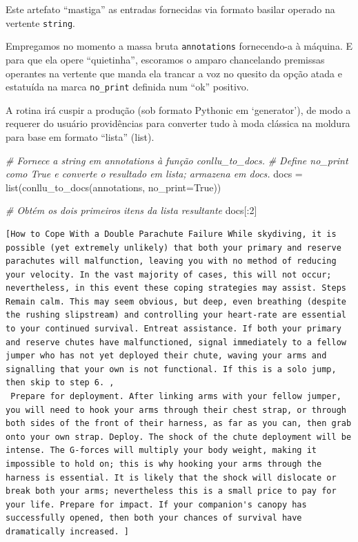 \documentclass[
  brazilian,
]{article}
\newenvironment{Shaded}{}{}
\newcommand{\BuiltInTok}[1]{#1}
\newcommand{\CommentTok}[1]{\textcolor[rgb]{0.38,0.63,0.69}{\textit{#1}}}
\newcommand{\DecValTok}[1]{\textcolor[rgb]{0.25,0.63,0.44}{#1}}
\newcommand{\NormalTok}[1]{#1}
\newcommand{\OperatorTok}[1]{\textcolor[rgb]{0.40,0.40,0.40}{#1}}
\newcommand{\VariableTok}[1]{\textcolor[rgb]{0.10,0.09,0.49}{#1}}
\begin{document}
Este artefato ``mastiga'' as entradas fornecidas via formato basilar
operado na vertente \texttt{string}.

Empregamos no momento a massa bruta \texttt{annotations} fornecendo-a à
máquina. E para que ela opere ``quietinha'', escoramos o amparo
chancelando premissas operantes na vertente que manda ela trancar a voz
no quesito da opção atada e estatuída na marca \texttt{no\_print}
definida num ``ok'' positivo.

A rotina irá cuspir a produção (sob formato Pythonic em `generator'), de
modo a requerer do usuário providências para converter tudo à moda
clássica na moldura para base em formato ``lista'' (list).

\begin{Shaded}
\begin{Highlighting}[]
\CommentTok{\# Fornece a string em \textquotesingle{}annotations\textquotesingle{} à função \textquotesingle{}conllu\_to\_docs\textquotesingle{}.}
\CommentTok{\# Define \textquotesingle{}no\_print\textquotesingle{} como True e converte o resultado em lista; armazena em \textquotesingle{}docs\textquotesingle{}.}
\NormalTok{docs }\OperatorTok{=} \BuiltInTok{list}\NormalTok{(conllu\_to\_docs(annotations, no\_print}\OperatorTok{=}\VariableTok{True}\NormalTok{))}

\CommentTok{\# Obtém os dois primeiros itens da lista resultante}
\NormalTok{docs[:}\DecValTok{2}\NormalTok{]}
\end{Highlighting}
\end{Shaded}

\begin{verbatim}
[How to Cope With a Double Parachute Failure While skydiving, it is possible (yet extremely unlikely) that both your primary and reserve parachutes will malfunction, leaving you with no method of reducing your velocity. In the vast majority of cases, this will not occur; nevertheless, in this event these coping strategies may assist. Steps Remain calm. This may seem obvious, but deep, even breathing (despite the rushing slipstream) and controlling your heart-rate are essential to your continued survival. Entreat assistance. If both your primary and reserve chutes have malfunctioned, signal immediately to a fellow jumper who has not yet deployed their chute, waving your arms and signalling that your own is not functional. If this is a solo jump, then skip to step 6. ,
 Prepare for deployment. After linking arms with your fellow jumper, you will need to hook your arms through their chest strap, or through both sides of the front of their harness, as far as you can, then grab onto your own strap. Deploy. The shock of the chute deployment will be intense. The G-forces will multiply your body weight, making it impossible to hold on; this is why hooking your arms through the harness is essential. It is likely that the shock will dislocate or break both your arms; nevertheless this is a small price to pay for your life. Prepare for impact. If your companion's canopy has successfully opened, then both your chances of survival have dramatically increased. ]
\end{verbatim}
\end{document}

